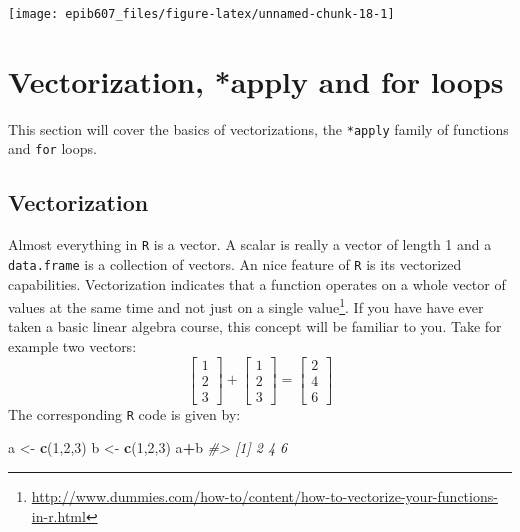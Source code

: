 \documentclass[]{book}
\makeatletter
\newenvironment{Shaded}{\begin{snugshade}}{\end{snugshade}}
\newcommand{\KeywordTok}[1]{\textcolor[rgb]{0.13,0.29,0.53}{\textbf{#1}}}
\newcommand{\DecValTok}[1]{\textcolor[rgb]{0.00,0.00,0.81}{#1}}
\newcommand{\StringTok}[1]{\textcolor[rgb]{0.31,0.60,0.02}{#1}}
\newcommand{\CommentTok}[1]{\textcolor[rgb]{0.56,0.35,0.01}{\textit{#1}}}
\newcommand{\OperatorTok}[1]{\textcolor[rgb]{0.81,0.36,0.00}{\textbf{#1}}}
\newcommand{\NormalTok}[1]{#1}
\let\rmarkdownfootnote\footnote%
\def\footnote{\protect\rmarkdownfootnote}
\newenvironment{kframe}{%
\medskip{}
\setlength{\fboxsep}{.8em}
 \def\at@end@of@kframe{}%
 \ifinner\ifhmode%
  \def\at@end@of@kframe{\end{minipage}}%
  \begin{minipage}{\columnwidth}%
 \fi\fi%
 \def\FrameCommand##1{\hskip\@totalleftmargin \hskip-\fboxsep
 \colorbox{shadecolor}{##1}\hskip-\fboxsep
     \hskip-\linewidth \hskip-\@totalleftmargin \hskip\columnwidth}%
 \MakeFramed {\advance\hsize-\width
   \@totalleftmargin\z@ \linewidth\hsize
   \@setminipage}}%
 {\par\unskip\endMakeFramed%
 \at@end@of@kframe}
\renewenvironment{Shaded}{\begin{kframe}}{\end{kframe}}
\makeatother
\begin{document}
\begin{center}\texttt{[image: epib607\_files/figure-latex/unnamed-chunk-18-1]} \end{center}

\appendix


\chapter{Vectorization, *apply and for
loops}\label{vectorization-apply-and-for-loops}

This section will cover the basics of vectorizations, the
\texttt{*apply} family of functions and \texttt{for} loops.

\section{Vectorization}\label{vectorization}

Almost everything in \texttt{R} is a vector. A scalar is really a vector
of length 1 and a \texttt{data.frame} is a collection of vectors. An
nice feature of \texttt{R} is its vectorized capabilities. Vectorization
indicates that a function operates on a whole vector of values at the
same time and not just on a single value\footnote{\url{http://www.dummies.com/how-to/content/how-to-vectorize-your-functions-in-r.html}}.
If you have have ever taken a basic linear algebra course, this concept
will be familiar to you. \newline  \vspace{0.1in} Take for example two
vectors: \newline
\vspace{0.1in} \[
\begin{bmatrix} 1 \\ 2 \\ 3 \end{bmatrix} + 
\begin{bmatrix} 1 \\ 2 \\ 3 \end{bmatrix} =
\begin{bmatrix} 2 \\ 4 \\ 6 \end{bmatrix}
\] \newline  \vspace{0.1in} The corresponding \texttt{R} code is given
by:

\begin{Shaded}
\begin{Highlighting}[]
\NormalTok{a <-}\StringTok{ }\KeywordTok{c}\NormalTok{(}\DecValTok{1}\NormalTok{,}\DecValTok{2}\NormalTok{,}\DecValTok{3}\NormalTok{)}
\NormalTok{b <-}\StringTok{ }\KeywordTok{c}\NormalTok{(}\DecValTok{1}\NormalTok{,}\DecValTok{2}\NormalTok{,}\DecValTok{3}\NormalTok{)}
\NormalTok{a}\OperatorTok{+}\NormalTok{b}
\CommentTok{#> [1] 2 4 6}
\end{Highlighting}
\end{Shaded}
\end{document}
